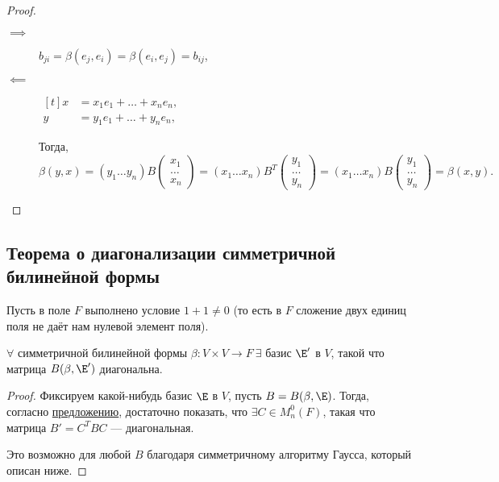 \begin{proof}~
    \begin{description}
    \item[$\implies$] $b_{ji} = \beta(e_j, e_i) = \beta(e_i, e_j) = b_{ij}$, 
    \item[$\impliedby$] 
        \begin{math}
            \begin{aligned}[t]
                x &= x_1 e_1 + \dots + x_n e_n, \\
                y &= y_1 e_1 + \dots + y_n e_n,
            \end{aligned}
        \end{math}

        Тогда, 
        \begin{equation*}
            \beta(y, x) = (y_1 \dots y_n) B \begin{pmatrix} x_1 \\ \dots \\ x_n \end{pmatrix} = (x_1 \dots x_n) B^{T} \begin{pmatrix} y_1 \\ \dots \\ y_n \end{pmatrix} = (x_1 \dots x_n) B \begin{pmatrix} y_1 \\ \dots \\ y_n \end{pmatrix} = \beta(x, y)
        .\end{equation*}
    \end{description}
\end{proof}

\subsection{Теорема о диагонализации симметричной билинейной формы}
\label{lec19:symmetric_bilinear_form_diagonalization}

Пусть в поле $F$ выполнено условие $1 + 1 \neq 0$ (то есть в $F$ сложение двух единиц поля не даёт нам нулевой элемент поля).

\begin{theorem}
    $\forall$ симметричной билинейной формы $\beta \colon V \times V \to F \ \exists$ базис $\E'$ в $V$, такой что матрица $B (\beta, \E')$ диагональна.
\end{theorem}

\begin{proof}
    Фиксируем какой-нибудь базис $\E$ в $V$, пусть $B = B(\beta, \E)$. Тогда, согласно \hyperref[lec19:bilinear_basis_change]{предложению}, достаточно показать, что $\exists C \in M^{0}_n (F)$, такая что матрица $B' = C^{T} B C$ --- диагональная.

    Это возможно для любой $B$ благодаря симметричному алгоритму Гаусса, который описан ниже.
\end{proof}

